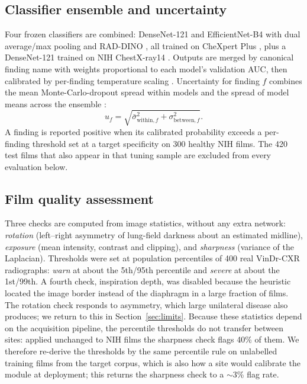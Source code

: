 \documentclass[conference]{IEEEtran}
\begin{document}
\subsection{Classifier ensemble and uncertainty}
Four frozen classifiers are combined: DenseNet-121 \cite{huang2017densenet} and
EfficientNet-B4 \cite{tan2019efficientnet} with dual average/max pooling and
RAD-DINO \cite{perezgarcia2025raddino}, all trained on CheXpert Plus
\cite{chambon2024chexpertplus}, plus a DenseNet-121 trained on NIH
ChestX-ray14 \cite{wang2017chestxray8}. Outputs are merged by canonical finding
name with weights proportional to each model's validation AUC, then calibrated
by per-finding temperature scaling \cite{guo2017calibration}. Uncertainty for
finding $f$ combines the mean Monte-Carlo-dropout spread within models
\cite{gal2016dropout} and the spread of model means across the ensemble
\cite{lakshminarayanan2017ensembles}:
\begin{equation}
u_f = \sqrt{\bar{\sigma}_{\text{within},f}^{2} + \sigma_{\text{between},f}^{2}} .
\end{equation}
A finding is reported positive when its calibrated probability exceeds a
per-finding threshold set at a target specificity on 300 healthy NIH films.
The 420 test films that also appear in that tuning sample are excluded from
every evaluation below.

\subsection{Film quality assessment}
Three checks are computed from image statistics, without any extra network:
\emph{rotation} (left--right asymmetry of lung-field darkness about an
estimated midline), \emph{exposure} (mean intensity, contrast and clipping),
and \emph{sharpness} (variance of the Laplacian). Thresholds were set at
population percentiles of 400 real VinDr-CXR radiographs: \emph{warn} at about
the 5th/95th percentile and \emph{severe} at about the 1st/99th. A fourth check,
inspiration depth, was disabled because the heuristic located the image border
instead of the diaphragm in a large fraction of films. The rotation check
responds to asymmetry, which large unilateral disease also produces; we return
to this in Section~\ref{sec:limits}. Because these statistics depend on the
acquisition pipeline, the percentile thresholds do not transfer between sites:
applied unchanged to NIH films the sharpness check flags 40\% of them. We
therefore re-derive the thresholds by the same percentile rule on unlabelled
training films from the target corpus, which is also how a site would calibrate
the module at deployment; this returns the sharpness check to a $\sim$3\% flag
rate.
\end{document}
